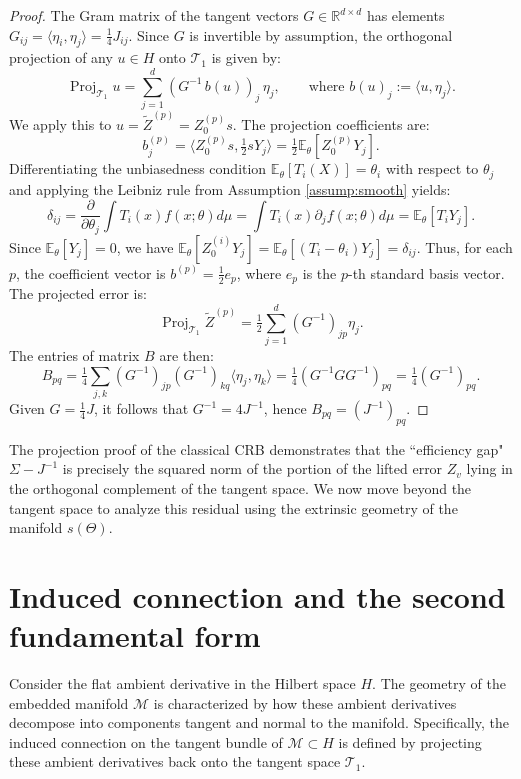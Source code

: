 \documentclass[pdflatex,sn-mathphys-num]{sn-jnl}%
\theoremstyle{thmstyleone}%
\theoremstyle{thmstyletwo}%
\theoremstyle{thmstylethree}%
\begin{document}
\begin{proof}
The Gram matrix of the tangent vectors \(G \in \mathbb{R}^{d\times d}\) has elements \(G_{ij} = \langle\eta_i,\eta_j\rangle = \frac{1}{4} J_{ij}\). Since \(G\) is invertible by assumption, the orthogonal projection of any \(u \in H\) onto \(\mathcal{T}_1\) is given by:
\[
\operatorname{Proj}_{\mathcal{T}_1} u = \sum_{j=1}^d \left( G^{-1} \, b(u) \right)_j \,\eta_j,
\qquad \text{where } b(u)_j := \langle u,\eta_j\rangle.
\]
We apply this to \(u = \widetilde Z^{(p)} = Z_0^{(p)} s\). The projection coefficients are:
\[
b^{(p)}_j = \langle Z_0^{(p)} s, \tfrac{1}{2} s Y_j \rangle = \tfrac{1}{2} \mathbb{E}_\theta[Z_0^{(p)} Y_j].
\]
Differentiating the unbiasedness condition \(\mathbb{E}_\theta[T_i(X)] = \theta_i\) with respect to \(\theta_j\) and applying the Leibniz rule from Assumption \ref{assump:smooth} yields:
\[
\delta_{ij} = \frac{\partial}{\partial \theta_j} \int T_i(x) f(x;\theta) d\mu = \int T_i(x) \partial_j f(x;\theta) d\mu = \mathbb{E}_\theta[T_i Y_j].
\]
Since \(\mathbb{E}_\theta[Y_j] = 0\), we have \(\mathbb{E}_\theta[Z_0^{(i)} Y_j] = \mathbb{E}_\theta[(T_i - \theta_i) Y_j] = \delta_{ij}\). Thus, for each \(p\), the coefficient vector is \(b^{(p)} = \frac{1}{2} e_p\), where \(e_p\) is the \(p\)-th standard basis vector. The projected error is:
\[
\operatorname{Proj}_{\mathcal{T}_1}\widetilde Z^{(p)} = \tfrac{1}{2} \sum_{j=1}^d (G^{-1})_{jp} \eta_j.
\]
The entries of matrix \(B\) are then:
\[
B_{pq} = \tfrac{1}{4} \sum_{j,k} (G^{-1})_{jp} (G^{-1})_{kq} \langle \eta_j, \eta_k \rangle = \tfrac{1}{4} (G^{-1} G G^{-1})_{pq} = \tfrac{1}{4} (G^{-1})_{pq}.
\]
Given \(G = \frac{1}{4} J\), it follows that \(G^{-1} = 4 J^{-1}\), hence \(B_{pq} = (J^{-1})_{pq}\).
\end{proof}

The projection proof of the classical CRB demonstrates that the ``efficiency gap" \(\Sigma - J^{-1}\) is precisely the squared norm of the portion of the lifted error \(Z_v\) lying in the orthogonal complement of the tangent space. We now move beyond the tangent space to analyze this residual using the extrinsic geometry of the manifold \(s(\Theta)\).

\section{Induced connection and the second fundamental form}\label{sec:geometry}

Consider the flat ambient derivative in the Hilbert space $H$. The geometry of the embedded manifold $\mathcal{M}$ is characterized by how these ambient derivatives decompose into components tangent and normal to the manifold. Specifically, the induced connection on the tangent bundle of \(\mathcal{M}\subset H\) is defined by projecting these ambient derivatives back onto the tangent space \(\mathcal{T}_1\).
\end{document}
